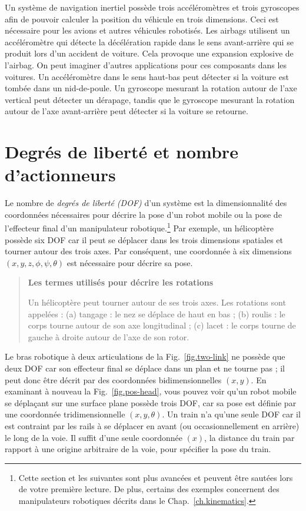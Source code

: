 {Un système de navigation inertiel possède trois accéléromètres et trois gyroscopes afin de pouvoir calculer la position du véhicule en trois dimensions. Ceci est nécessaire pour les avions et autres véhicules robotisés. Les airbags utilisent un accéléromètre qui détecte la décélération rapide dans le sens avant-arrière qui se produit lors d'un accident de voiture. Cela provoque une expansion explosive de l'airbag. On peut imaginer d'autres applications pour ces composants dans les voitures. Un accéléromètre dans le sens haut-bas peut détecter si la voiture est tombée dans un nid-de-poule. Un gyroscope mesurant la rotation autour de l'axe vertical peut détecter un dérapage, tandis que le gyroscope mesurant la rotation autour de l'axe avant-arrière peut détecter si la voiture se retourne.


\section{Degrés de liberté et nombre d'actionneurs}\label{s.dof}

Le nombre de \emph{degrés de liberté (DOF)} d'un système est la dimensionnalité des coordonnées nécessaires pour décrire la pose d'un robot mobile ou la pose de l'effecteur final d'un manipulateur robotique.\footnote{Cette section et les suivantes sont plus avancées et peuvent être sautées lors de votre première lecture. De plus, certains des exemples concernent des manipulateurs robotiques décrits dans le Chap.~\ref{ch.kinematics}.} Par exemple, un hélicoptère possède six DOF car il peut se déplacer dans les trois dimensions spatiales et tourner autour des trois axes. Par conséquent, une coordonnée à six dimensions $(x,y,z,\phi,\psi,\theta)$ est nécessaire pour décrire sa pose.

\begin{quote}
\begin{center}
\textbf{Les termes utilisés pour décrire les rotations}
\end{center}
Un hélicoptère peut tourner autour de ses trois axes. Les rotations sont appelées : (a) tangage : le nez se déplace de haut en bas ; (b) roulis : le corps tourne autour de son axe longitudinal ; (c) lacet : le corps tourne de gauche à droite autour de l'axe de son rotor.
\end{quote}

Le bras robotique à deux articulations de la Fig.~\ref{fig.two-link} ne possède que deux DOF car son effecteur final se déplace dans un plan et ne tourne pas ; il peut donc être décrit par des coordonnées bidimensionnelles $(x,y)$. En examinant à nouveau la Fig.~\ref{fig.pos-head}, vous pouvez voir qu'un robot mobile se déplaçant sur une surface plane possède trois DOF, car sa pose est définie par une coordonnée tridimensionnelle $(x,y,\theta)$. Un train n'a qu'une seule DOF car il est contraint par les rails à se déplacer en avant (ou occasionnellement en arrière) le long de la voie. Il suffit d'une seule coordonnée $(x)$, la distance du train par rapport à une origine arbitraire de la voie, pour spécifier la pose du train.


}
